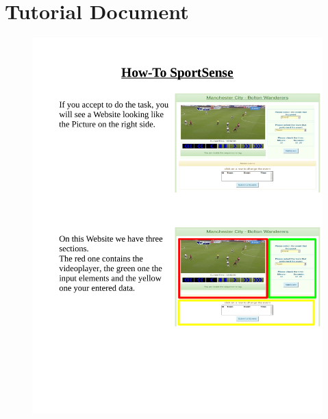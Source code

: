 \chapter{Tutorial Document}

\begin{figure}[H]
    \centering
    \includegraphics[scale=0.6, angle=-90, origin=c]{Figures/appendix/Documentation.pdf}
\end{figure}



